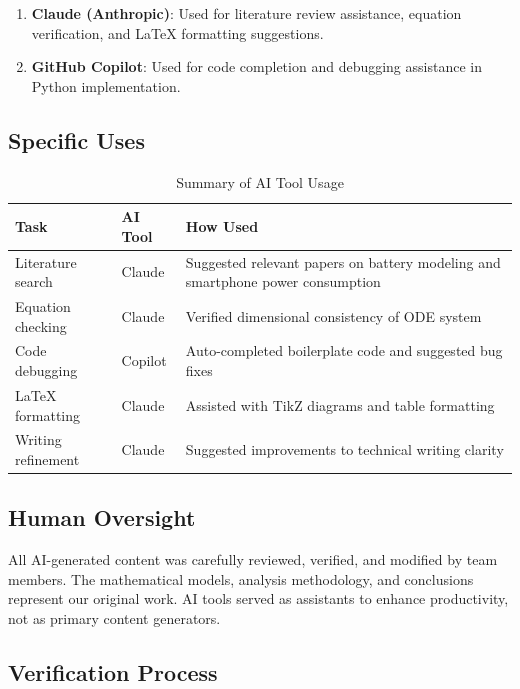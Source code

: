 \begin{enumerate}
    \item \textbf{Claude (Anthropic)}: Used for literature review assistance, equation verification, and LaTeX formatting suggestions.
    
    \item \textbf{GitHub Copilot}: Used for code completion and debugging assistance in Python implementation.
\end{enumerate}

\subsection{Specific Uses}

\begin{table}[H]
\centering
\caption{Summary of AI Tool Usage}
\begin{tabular}{p{3cm}p{4cm}p{5cm}}
\toprule
\textbf{Task} & \textbf{AI Tool} & \textbf{How Used} \\
\midrule
Literature search & Claude & Suggested relevant papers on battery modeling and smartphone power consumption \\
\addlinespace
Equation checking & Claude & Verified dimensional consistency of ODE system \\
\addlinespace
Code debugging & Copilot & Auto-completed boilerplate code and suggested bug fixes \\
\addlinespace
LaTeX formatting & Claude & Assisted with TikZ diagrams and table formatting \\
\addlinespace
Writing refinement & Claude & Suggested improvements to technical writing clarity \\
\bottomrule
\end{tabular}
\end{table}

\subsection{Human Oversight}

All AI-generated content was carefully reviewed, verified, and modified by team members. The mathematical models, analysis methodology, and conclusions represent our original work. AI tools served as assistants to enhance productivity, not as primary content generators.

\subsection{Verification Process}


